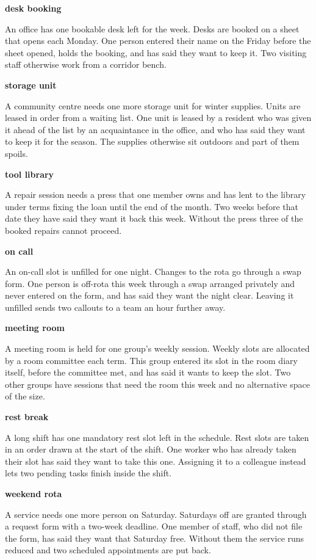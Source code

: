 \documentclass[
  11pt]{article}
\begin{document}
\textbf{desk booking}

An office has one bookable desk left for the week. Desks are booked on a
sheet that opens each Monday. One person entered their name on the
Friday before the sheet opened, holds the booking, and has said they
want to keep it. Two visiting staff otherwise work from a corridor
bench.

\textbf{storage unit}

A community centre needs one more storage unit for winter supplies.
Units are leased in order from a waiting list. One unit is leased by a
resident who was given it ahead of the list by an acquaintance in the
office, and who has said they want to keep it for the season. The
supplies otherwise sit outdoors and part of them spoils.

\textbf{tool library}

A repair session needs a press that one member owns and has lent to the
library under terms fixing the loan until the end of the month. Two
weeks before that date they have said they want it back this week.
Without the press three of the booked repairs cannot proceed.

\textbf{on call}

An on-call slot is unfilled for one night. Changes to the rota go
through a swap form. One person is off-rota this week through a swap
arranged privately and never entered on the form, and has said they want
the night clear. Leaving it unfilled sends two callouts to a team an
hour further away.

\textbf{meeting room}

A meeting room is held for one group's weekly session. Weekly slots are
allocated by a room committee each term. This group entered its slot in
the room diary itself, before the committee met, and has said it wants
to keep the slot. Two other groups have sessions that need the room this
week and no alternative space of the size.

\textbf{rest break}

A long shift has one mandatory rest slot left in the schedule. Rest
slots are taken in an order drawn at the start of the shift. One worker
who has already taken their slot has said they want to take this one.
Assigning it to a colleague instead lets two pending tasks finish inside
the shift.

\textbf{weekend rota}

A service needs one more person on Saturday. Saturdays off are granted
through a request form with a two-week deadline. One member of staff,
who did not file the form, has said they want that Saturday free.
Without them the service runs reduced and two scheduled appointments are
put back.
\end{document}
